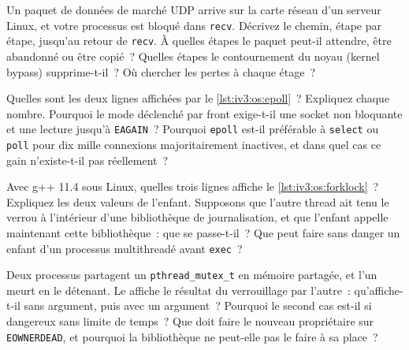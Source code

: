 \begin{question}\label{iq:iv3:operating-systems-concurrency-and-networks:33}
Un paquet de données de marché UDP arrive sur la carte réseau d'un serveur Linux, et votre processus est bloqué dans \texttt{recv}. Décrivez le chemin, étape par étape, jusqu'au retour de \texttt{recv}. À quelles étapes le paquet peut-il attendre, être abandonné ou être copié~? Quelles étapes le contournement du noyau (kernel bypass) supprime-t-il~? Où chercher les pertes à chaque étage~?
\end{question}

\begin{question}\label{iq:iv3:operating-systems-concurrency-and-networks:34}
Quelles sont les deux lignes affichées par le \cref{lst:iv3:os:epoll}~? Expliquez chaque nombre. Pourquoi le mode déclenché par front exige-t-il une socket non bloquante et une lecture jusqu'à \texttt{EAGAIN}~? Pourquoi \texttt{epoll} est-il préférable à \texttt{select} ou \texttt{poll} pour dix mille connexions majoritairement inactives, et dans quel cas ce gain n'existe-t-il pas réellement~?
\label{lst:iv3:os:epoll}
\end{question}

\begin{question}\label{iq:iv3:operating-systems-concurrency-and-networks:35}
Avec g++ 11.4 sous Linux, quelles trois lignes affiche le \cref{lst:iv3:os:forklock}~? Expliquez les deux valeurs de l'enfant. Supposons que l'autre thread ait tenu le verrou à l'intérieur d'une bibliothèque de journalisation, et que l'enfant appelle maintenant cette bibliothèque~: que se passe-t-il~? Que peut faire sans danger un enfant d'un processus multithreadé avant \texttt{exec}~?
\label{lst:iv3:os:forklock}
\end{question}

\begin{question}\label{iq:iv3:operating-systems-concurrency-and-networks:36}
Deux processus partagent un \texttt{pthread\_mutex\_t} en mémoire partagée, et l'un meurt en le détenant. Le  affiche le résultat du verrouillage par l'autre~: qu'affiche-t-il sans argument, puis avec un argument~? Pourquoi le second cas est-il si dangereux sans limite de temps~? Que doit faire le nouveau propriétaire sur \texttt{EOWNERDEAD}, et pourquoi la bibliothèque ne peut-elle pas le faire à sa place~?
\label{lst:iv3:os:robust}
\end{question}

